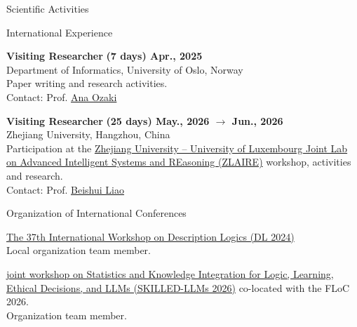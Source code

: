 \documentclass{resume} %
\begin{document}
\begin{rSection}{Scientific Activities}
\begin{rSubsection2}{International Experience}
            \item\textbf{ Visiting Researcher }\hfill \textbf{(7 days) Apr., 2025}
            \\Department of Informatics, University of Oslo, Norway
            \\Paper writing and research activities.
            \\Contact: Prof. \href{mailto:anaoz@ifi.uio.no}{Ana Ozaki}

            \item\textbf{ Visiting Researcher }\hfill \textbf{(25 days) May., 2026 $\rightarrow$ Jun., 2026}
            \\Zhejiang University, Hangzhou, China
            \\Participation at the \href{https://www.zlaire.net/}{Zhejiang University – University of Luxembourg Joint Lab on Advanced Intelligent Systems and REasoning (ZLAIRE)} workshop, activities and research.
            \\Contact: Prof. \href{mailto:baiseliao@zju.edu.cn}{Beishui Liao}

        \end{rSubsection2}



        \begin{rSubsection2}{Organization of International Conferences}
            \item \href{https://dl2024.w.uib.no/organization/}{The 37th International Workshop on Description Logics (DL 2024)}
            \\Local organization team member.
            \item \href{https://skilled-llms.github.io/2026/}{joint workshop on Statistics and Knowledge Integration for Logic, Learning, Ethical Decisions, and LLMs (SKILLED-LLMs 2026)} co-located with the FLoC 2026.
            \\Organization team member.
        \end{rSubsection2}



\end{rSection}
\end{document}
